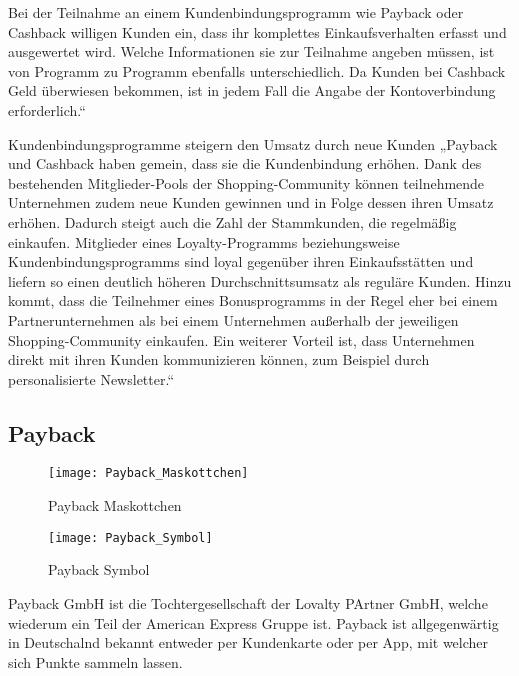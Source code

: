 Bei der Teilnahme an einem Kundenbindungsprogramm wie Payback oder Cashback willigen Kunden ein, dass ihr komplettes Einkaufsverhalten erfasst und ausgewertet wird. Welche Informationen sie zur Teilnahme angeben müssen, ist von Programm zu Programm ebenfalls unterschiedlich. Da Kunden bei Cashback Geld überwiesen bekommen, ist in jedem Fall die Angabe der Kontoverbindung erforderlich.“ \label{paycashback_all} \newline

Kundenbindungsprogramme steigern den Umsatz durch neue Kunden \newline
„Payback und Cashback haben gemein, dass sie die Kundenbindung erhöhen. Dank des bestehenden Mitglieder-Pools der Shopping-Community können teilnehmende Unternehmen zudem neue Kunden gewinnen und in Folge dessen ihren Umsatz erhöhen. Dadurch steigt auch die Zahl der Stammkunden, die regelmäßig einkaufen.
Mitglieder eines Loyalty-Programms beziehungsweise Kundenbindungsprogramms sind loyal gegenüber ihren Einkaufsstätten und liefern so einen deutlich höheren Durchschnittsumsatz als reguläre Kunden. Hinzu kommt, dass die Teilnehmer eines Bonusprogramms in der Regel eher bei einem Partnerunternehmen als bei einem Unternehmen außerhalb der jeweiligen Shopping-Community einkaufen. Ein weiterer Vorteil ist, dass Unternehmen direkt mit ihren Kunden kommunizieren können, zum Beispiel durch personalisierte Newsletter.“ \label{paycashback_all} \newline

\subsection{Payback}
\begin{figure}[!ht]
	\centering
	\texttt{[image: Payback\_Maskottchen]}
	\caption{Payback Maskottchen}
	\label{fig:Payback}
\end{figure}
\FloatBarrier

\begin{figure}[!ht]
	\centering
	\texttt{[image: Payback\_Symbol]}
	\caption{Payback Symbol}
	\label{fig:Payback}
\end{figure}
\FloatBarrier

Payback GmbH ist die Tochtergesellschaft der Lovalty PArtner GmbH, welche wiederum ein Teil der American Express Gruppe ist. \label{Payback_Info} Payback ist allgegenwärtig in Deutschalnd bekannt entweder per Kundenkarte oder per App, mit welcher sich Punkte sammeln lassen.

